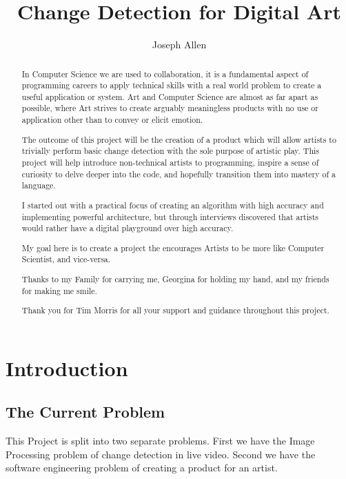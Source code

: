 \documentclass[a4paper]{report}
\title{Change Detection for Digital Art}
\author{Joseph Allen}
\begin{document}
\maketitle

\begin{abstract}
In Computer Science we are used to collaboration, it is a fundamental aspect of programming careers to apply technical skills with a real world problem to create a useful application or system. Art and Computer Science are almost as far apart as possible, where Art strives to create arguably meaningless products with no use or application other than to convey or elicit emotion. 

The outcome of this project will be the creation of a product which will allow artists to trivially perform basic change detection with the sole purpose of artistic play. This project will help introduce non-technical artists to programming, inspire a sense of curiosity to delve deeper into the code, and hopefully transition them into mastery of a language.

I started out with a practical focus of creating an algorithm with high accuracy and implementing powerful architecture, but through interviews discovered that artists would rather have a digital playground over high accuracy.

My goal here is to create a project the encourages Artists to be more like Computer Scientist, and vice-versa.
\end{abstract}

\renewcommand{\abstractname}{Acknowledgements}
\begin{abstract}
Thanks to my Family for carrying me, Georgina for holding my hand, and my friends for making me smile.


Thank you for Tim Morris for all your support and guidance throughout this project.
\end{abstract}

\tableofcontents
\clearpage

\section{Introduction}
\subsection{The Current Problem}
This Project is split into two separate problems. First we have the Image Processing problem of change detection in live video. Second we have the software engineering problem of creating a product for an artist.
\end{document}
